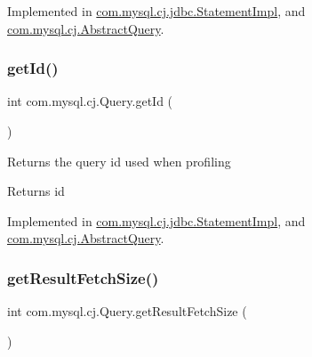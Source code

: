 Implemented in \mbox{\hyperlink{classcom_1_1mysql_1_1cj_1_1jdbc_1_1_statement_impl_a718d61ccf9261f402e7d28a295aca55c}{com.\+mysql.\+cj.\+jdbc.\+Statement\+Impl}}, and \mbox{\hyperlink{classcom_1_1mysql_1_1cj_1_1_abstract_query_aff7c49f712e8aa2e756fc9668f428970}{com.\+mysql.\+cj.\+Abstract\+Query}}.

\mbox{\label{interfacecom_1_1mysql_1_1cj_1_1_query_a29f450bbae1063765d434e3b89bdd26e}} 
\subsubsection{\texorpdfstring{get\+Id()}{getId()}}
{\footnotesize\ttfamily int com.\+mysql.\+cj.\+Query.\+get\+Id (\begin{DoxyParamCaption}{ }\end{DoxyParamCaption})}

Returns the query id used when profiling

\begin{DoxyReturn}{Returns}
id 
\end{DoxyReturn}


Implemented in \mbox{\hyperlink{classcom_1_1mysql_1_1cj_1_1jdbc_1_1_statement_impl_a42a752f62a59215845a9faf514893dba}{com.\+mysql.\+cj.\+jdbc.\+Statement\+Impl}}, and \mbox{\hyperlink{classcom_1_1mysql_1_1cj_1_1_abstract_query_a68f5ab0f91a8e8343951099d44860d36}{com.\+mysql.\+cj.\+Abstract\+Query}}.

\mbox{\label{interfacecom_1_1mysql_1_1cj_1_1_query_a6f08d61e84781710d7e9c4680c2835b3}} 
\subsubsection{\texorpdfstring{get\+Result\+Fetch\+Size()}{getResultFetchSize()}}
{\footnotesize\ttfamily int com.\+mysql.\+cj.\+Query.\+get\+Result\+Fetch\+Size (\begin{DoxyParamCaption}{ }\end{DoxyParamCaption})}



